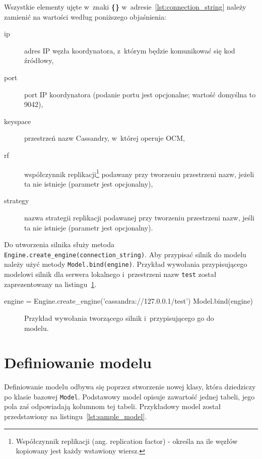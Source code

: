 Wszystkie elementy ujęte w~znaki \textbf{\{\}} w~adresie~\ref{lst:connection_string} należy zamienić na wartości według poniższego objaśnienia:

\begin{description}
	\item[ip] adres IP węzła koordynatora, z~którym będzie komunikować się kod źródłowy,
	\item[port] port IP koordynatora (podanie portu jest opcjonalne; wartość domyślna to 9042),
	\item[keyspace] przestrzeń nazw Cassandry, w~której operuje OCM,
	\item[rf] współczynnik replikacji\footnote{Współczynnik replikacji (ang. replication factor) - określa na ile węzłów kopiowany jest każdy wstawiony wiersz.} podawany przy tworzeniu przestrzeni nazw, jeżeli ta nie istnieje (parametr jest opcjonalny),
	\item[strategy] nazwa strategii replikacji podawanej przy tworzeniu przestrzeni nazw, jeśli ta nie istnieje (parametr jest opcjonalny).
\end{description}

Do utworzenia silnika służy metoda \verb+Engine.create_engine(connection_string)+. Aby przypisać silnik do modelu należy użyć metody \verb+Model.bind(engine)+. Przykład wywołania przypisującego modelowi silnik dla serwera lokalnego i~przestrzeni nazw \verb+test+ został zaprezentowany na listingu~\ref{lst:engine_creation}.

\begin{verbbox}
	engine = Engine.create_engine('cassandra://127.0.0.1/test')
	Model.bind(engine)
\end{verbbox}

\begin{figure}[ht!]
	\centering
	\theverbbox
	\caption{Przykład wywołania tworzącego silnik i~przypisującego go do modelu.}
	\label{lst:engine_creation}
\end{figure} 

\section{Definiowanie modelu}

Definiowanie modelu odbywa się poprzez stworzenie nowej klasy, która dziedziczy po klasie bazowej \verb+Model+. Podstawowy model opisuje zawartość jednej tabeli, jego pola zaś odpowiadają kolumnom tej tabeli. Przykładowy model został przedstawiony na listingu~\ref{lst:sample_model}.

